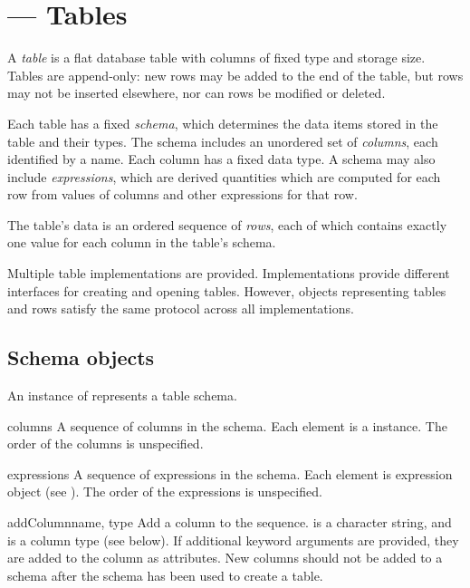 \section{ --- Tables}


A \pyhep \emph{table} is a flat database table with columns of fixed
type and storage size.  Tables are append-only: new rows may be added to
the end of the table, but rows may not be inserted elsewhere, nor can
rows be modified or deleted.  

Each table has a fixed \emph{schema}, which determines the data items
stored in the table and their types.  The schema includes an unordered
set of \emph{columns}, each identified by a name.  Each column has a
fixed data type.  A schema may also include \emph{expressions}, which
are derived quantities which are computed for each row from values of
columns and other expressions for that row.  

The table's data is an ordered sequence of \emph{rows}, each of which
contains exactly one value for each column in the table's schema.

Multiple table implementations are provided.  Implementations provide
different interfaces for creating and opening tables.  However, objects
representing tables and rows satisfy the same protocol across all
implementations.


\subsection{Schema objects}

An instance of  represents a table schema.  

\begin{memberdesc}{columns}
 \readonly A sequence of columns in the schema.  Each element is a
  instance.  The order of the columns is unspecified.
\end{memberdesc}

\begin{memberdesc}{expressions}
 \readonly A sequence of expressions in the schema.  Each element is
 expression object (see ).  The order of the
 expressions is unspecified.
\end{memberdesc}

\begin{methoddesc}{addColumn}{name, type}
 Add a column to the sequence.   is a character string, and
  is a column type (see below).  If additional keyword
 arguments are provided, they are added to the column as attributes.
 New columns should not be added to a schema after the schema has been
 used to create a table.
\end{methoddesc}

